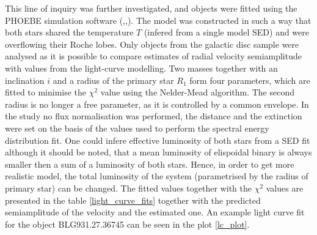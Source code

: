 \documentclass{pracalicmgr}
\begin{document}
This line of inquiry was further investigated, and objects were fitted using the
PHOEBE simulation software (\citet*{wilson_realization_1971},\citet*{prsa_computational_2005},\citet*{conroy_physics_2020}).
The model was constructed in such a way that both stars shared the temperature $T$ (infered from a single model SED) and were overflowing their Roche lobes.
Only objects from the galactic disc sample were analysed as it is possible to compare estimates of radial velocity semiamplitude with
values from the light-curve modelling.
Two masses together with an inclination $i$ and a radius of the primary star $R_1$ form four parameters, which are fitted to minimise the $\chi^2$ value using the Nelder-Mead algorithm.
The second radius is no longer a free parameter, as it is controlled by a common envelope.
In the study no flux normalisation was performed, the distance and the extinction were set on the basis of the values used to perform the spectral energy distribution fit.
One could infere effective luminosity of both stars from a SED fit although it should be noted, that a mean luminosity of elispoidal binary is always smaller 
then a sum of a luminosity of both stars. Hence, in order to get more realistic model, the total luminosity of the system (parametrised by the radius of primary star) can be 
changed. 
The fitted values together with the $\chi^2$ values are presented in the table \ref{light_curve_fits}
together with the predicted semiamplitude of the velocity and the estimated one.
An example light curve fit for the object BLG931.27.36745 can be seen in the plot \ref{lc_plot}.
\end{document}

